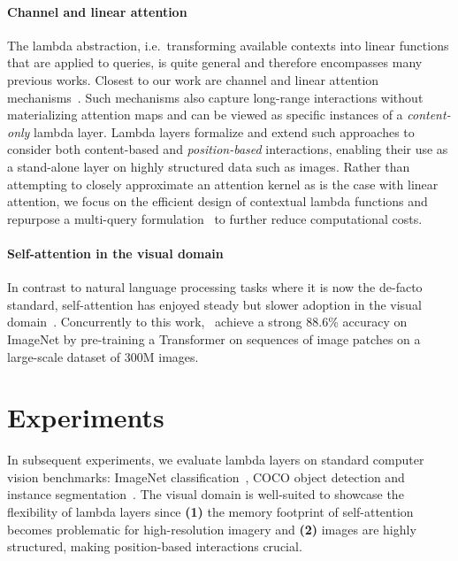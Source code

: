 \documentclass{article} \usepackage{iclr2021_conference,times}
\begin{document}
\vspace{-0.15cm}
\paragraph{Channel and linear attention} The lambda abstraction, i.e.\ transforming available contexts into linear functions that are applied to queries, is quite general and therefore encompasses many previous works.
Closest to our work are channel and linear attention mechanisms~\citep{hu2017squeeze,katharopoulos2020transformers,choromanski2020rethinking}.
Such mechanisms also capture long-range interactions without materializing attention maps and can be viewed as specific instances of a \emph{content-only} lambda layer.
Lambda layers formalize and extend such approaches to consider both content-based and \emph{position-based} interactions, enabling their use as a stand-alone layer on highly structured data such as images.
Rather than attempting to closely approximate an attention kernel as is the case with linear attention, we focus on the efficient design of contextual lambda functions and repurpose a multi-query formulation~\citep{shazeer2019fast} to further reduce computational costs.

\vspace{-0.15cm}
\paragraph{Self-attention in the visual domain}
In contrast to natural language processing tasks where it is now the de-facto standard, self-attention has enjoyed steady but slower adoption in the visual domain~\citep{wang2018non,bello2019aacn,ramachandran2019sasa,carion2020endtoend}.
Concurrently to this work,~\cite{dosovitskiy2020image} achieve a strong 88.6\% accuracy on ImageNet by pre-training a Transformer on sequences of image patches on a large-scale dataset of 300M images. \section{Experiments\label{sec:experiments}}
In subsequent experiments, we evaluate lambda layers on standard computer vision benchmarks:
ImageNet classification~\citep{deng2009imagenet},
COCO object detection and instance segmentation~\citep{lin2014microsoft}.
The visual domain is well-suited to showcase the flexibility of lambda layers since
\textbf{(1)} the memory footprint of self-attention becomes problematic for high-resolution imagery and
\textbf{(2)} images are highly structured, making position-based interactions crucial.
\end{document}

